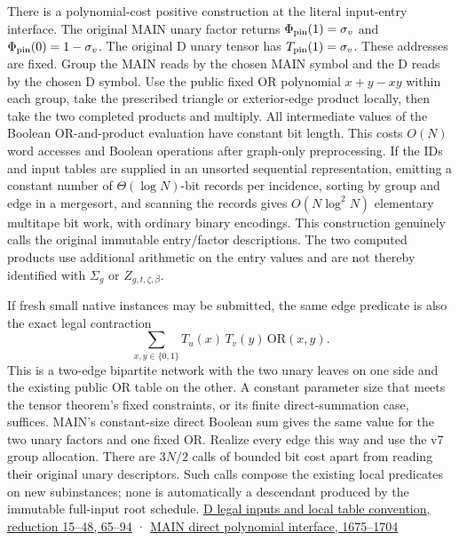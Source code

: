 \documentclass[11pt,a4paper]{article}
\begin{document}
There is a polynomial-cost positive construction at the literal
input-entry interface. The original MAIN unary factor returns
\(\Phi_{\rm pin}(1)=\sigma_v\) and \(\Phi_{\rm pin}(0)=1-\sigma_v\). The
original D unary tensor has \(T_{\rm pin}(1)=\sigma_v\). These addresses
are fixed. Group the MAIN reads by the chosen MAIN symbol and the D
reads by the chosen D symbol. Use the public fixed OR polynomial
\(x+y-xy\) within each group, take the prescribed triangle or
exterior-edge product locally, then take the two completed products and
multiply. All intermediate values of the Boolean OR-and-product
evaluation have constant bit length. This costs \(O(N)\) word accesses
and Boolean operations after graph-only preprocessing. If the IDs and
input tables are supplied in an unsorted sequential representation,
emitting a constant number of \(\Theta(\log N)\)-bit records per
incidence, sorting by group and edge in a mergesort, and scanning the
records gives \(O(N\log^2 N)\) elementary multitape bit work, with
ordinary binary encodings. This construction genuinely calls the
original immutable entry/factor descriptions. The two computed products
use additional arithmetic on the entry values and are not thereby
identified with \(\Sigma_g\) or \(Z_{g,t,\zeta,\beta}\).

If fresh small native instances may be submitted, the same edge
predicate is also the exact legal contraction \[
 \sum_{x,y\in\{0,1\}}T_u(x)\,T_v(y)\,\mathrm{OR}(x,y).
\] This is a two-edge bipartite network with the two unary leaves on one
side and the existing public OR table on the other. A constant parameter
size that meets the tensor theorem's fixed constraints, or its finite
direct-summation case, suffices. MAIN's constant-size direct Boolean sum
gives the same value for the two unary factors and one fixed OR. Realize
every edge this way and use the v7 group allocation. There are \(3N/2\)
calls of bounded bit cost apart from reading their original unary
descriptors. Such calls compose the existing local predicates on new
subinstances; none is automatically a descendant produced by the
immutable full-input root schedule.
\href{https://github.com/openai/math/blob/main/preprints/The-Exponential-Time-Hypothesis-is-False-October-25-2026/build/quantitative-reduction.tex\#L15}{D
legal inputs and local table convention, reduction 15--48, 65--94} ·
\href{https://github.com/openai/math/blob/main/preprints/The-Exponential-Time-Hypothesis-is-False-October-25-2026/build/main_full_version.tex\#L1675}{MAIN
direct polynomial interface, 1675--1704}
\end{document}
